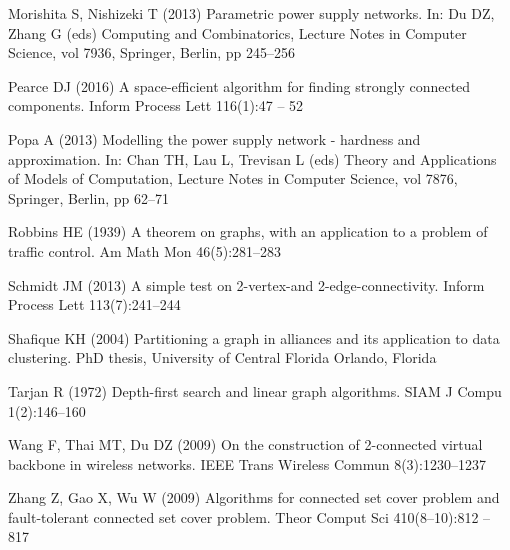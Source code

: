 \begin{thebibliography}{38}
Morishita S, Nishizeki T (2013) Parametric power supply networks. In: Du DZ,
  Zhang G (eds) Computing and Combinatorics, Lecture Notes in Computer Science,
  vol 7936, Springer, Berlin, pp 245--256

Pearce DJ (2016) A space-efficient algorithm for finding strongly connected
  components. Inform Process Lett 116(1):47 -- 52

Popa A (2013) Modelling the power supply network - hardness and approximation.
  In: Chan TH, Lau L, Trevisan L (eds) Theory and Applications of Models of
  Computation, Lecture Notes in Computer Science, vol 7876, Springer, Berlin,
  pp 62--71

Robbins HE (1939) A theorem on graphs, with an application to a problem of
  traffic control. Am Math Mon 46(5):281--283

Schmidt JM (2013) A simple test on 2-vertex-and 2-edge-connectivity. Inform
  Process Lett 113(7):241--244

Shafique KH (2004) Partitioning a graph in alliances and its application to
  data clustering. PhD thesis, University of Central Florida Orlando, Florida

Tarjan R (1972) Depth-first search and linear graph algorithms. SIAM J Compu
  1(2):146--160

Wang F, Thai MT, Du DZ (2009) On the construction of 2-connected virtual
  backbone in wireless networks. IEEE Trans Wireless Commun 8(3):1230--1237

Zhang Z, Gao X, Wu W (2009) Algorithms for connected set cover problem and
  fault-tolerant connected set cover problem. Theor Comput Sci 410(8–10):812
  -- 817

\end{thebibliography}





